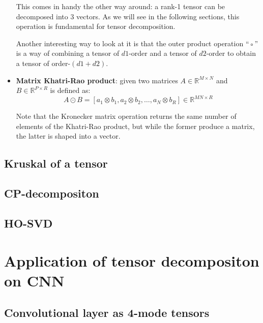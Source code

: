 \begin{itemize}
        This comes in handy the other way around: a rank-1 tensor can be decomposed into 3 vectors. As we will see in the following sections, this operation is fundamental for tensor decomposition.
        
        Another interesting way to look at it is that the outer product operation “◦” is a way of combining a tensor of $d1$-order and a tensor of $d2$-order to obtain a tensor of order-$(d1+d2)$.

    \item \textbf{Matrix Khatri-Rao product}: given two matrices $A \in \mathbb{R}^{M \times N}$ and $B \in            \mathbb{R}^{P \times R}$ is defined as: 
        \begin{equation}
            A \odot B = [a_1 \otimes b_1, a_2 \otimes b_2, \ldots, a_N \otimes b_R] \in \mathbb{R}^{MN \times R}
        \end{equation}
        
        Note that the Kronecker matrix operation returns the same number of elements of the Khatri-Rao product, but while the former produce a matrix, the latter is shaped into a vector.   


\end{itemize}

\subsection{Kruskal of a tensor}

\subsection{CP-decompositon}

\subsection{HO-SVD}


\section{Application of tensor decompositon on CNN}
\subsection{Convolutional layer as 4-mode tensors}

